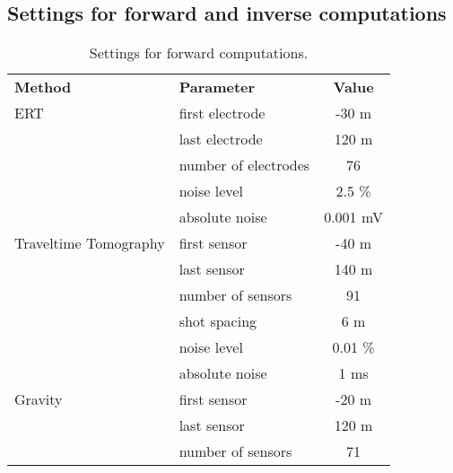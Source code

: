 \subsection{Settings for forward and inverse computations}\label{appendix:Settings}

\begin{table}[H]
\centering
\caption{Settings for forward computations.}
\begin{tabular}{llc}
\hline
\textbf{Method}       & \textbf{Parameter}   & \textbf{Value} \\ \cline{1-3}
ERT                   & first electrode      & -30 m\\
                      & last electrode       & 120 m\\
                      & number of electrodes & 76\\
                      & noise level          & 2.5 \% \\
                      & absolute noise       & 0.001 mV \\ \cline{1-3}
Traveltime Tomography & first sensor         & -40 m \\
                      & last sensor          & 140 m \\
                      & number of sensors    & 91\\
                      & shot spacing         & 6 m\\
                      & noise level          & 0.01 \%  \\
                      & absolute noise       & 1 ms \\ \cline{1-3}
Gravity               & first sensor         & -20 m  \\
                      & last sensor          & 120 m   \\
                      & number of sensors    & 71       \\ \cline{1-3}
\end{tabular}
\label{table:settings_forw}
\end{table}

